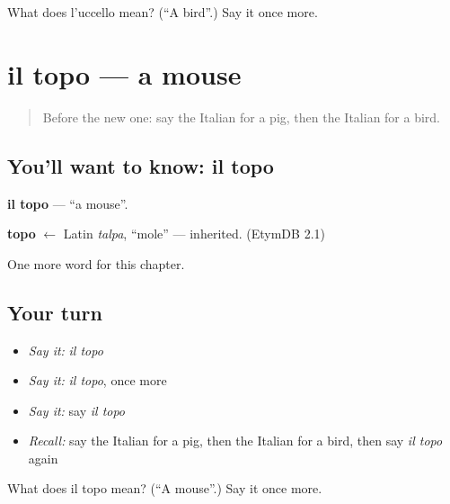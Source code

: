 \begin{tcolorbox}[breakable,colback=teal!4,colframe=teal!35!black,title={Before you move on}]
What does l'uccello mean? (\textquotedblleft{}A bird\textquotedblright{}.) Say it once more.
\end{tcolorbox}
\section[il topo]{il topo — a mouse}

\label{lesson:IT-C69-topo}



\begin{quote}
Before the new one: say the Italian for a pig, then the Italian for a bird.
\end{quote}

\subsection*{You'll want to know: il topo}
\textbf{il topo} — \textquotedblleft{}a mouse\textquotedblright{}.

\begin{cousinweb}
\textbf{topo} $\leftarrow$ Latin \emph{talpa}, \textquotedblleft{}mole\textquotedblright{} — inherited. (EtymDB 2.1)
\end{cousinweb}

\begin{grammarlens}[title={What you've built}]
One more word for this chapter.
\end{grammarlens}

\subsection*{Your turn}
\begin{itemize}
\raggedright
  \item \emph{Say it:} \emph{il topo}
  \item \emph{Say it:} \emph{il topo}, once more
  \item \emph{Say it:} say \emph{il topo}
  \item \emph{Recall:} say the Italian for a pig, then the Italian for a bird, then say \emph{il topo} again
\end{itemize}

\begin{tcolorbox}[breakable,colback=teal!4,colframe=teal!35!black,title={Before you move on}]
What does il topo mean? (\textquotedblleft{}A mouse\textquotedblright{}.) Say it once more.
\end{tcolorbox}
